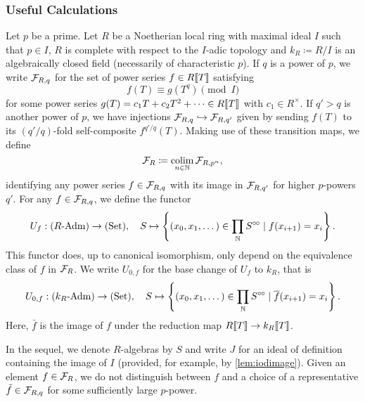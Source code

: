 \documentclass[../main.tex]{subfiles}
\begin{document}
\subsubsection{Useful Calculations} %
\label{ssub:Useful Calculations}
Let $p$ be a prime. Let $R$ be a Noetherian local ring with maximal ideal $I$
such that $p \in I$, $R$ is complete with respect to the $I$-adic topology and
$k_R \coloneqq R/I$ is an algebraically closed field (necessarily of
characteristic $p$). If $q$ is a power of $p$, we write $\mathcal{F}_{R,q}$ for the set
of power series $f \in R\llbracket T \rrbracket$ satisfying 
\begin{equation} \label{eq:condonpowerseries}
  f(T) \equiv g(T^q) \pmod I
\end{equation}
for some power series $g(T) = c_1 T + c_2 T^2 + \dots \in R\llbracket T \rrbracket$ with 
$c_1 \in R^\times$. 
If $q'>q$ is another power of $p$, we have injections $\mathcal{F}_{R,q} \hookrightarrow \mathcal{F}_{R,q'}$
given by sending $f(T)$ to its $(q'/q)$-fold self-composite $f^{q'/q}(T)$. 
Making use of these transition maps, we define
\begin{equation*}
  \mathcal{F}_R \coloneqq \operatorname*{colim}_{n \in \mathbb{N}} \mathcal{F}_{R, p^n},
\end{equation*}
identifying any power series $f \in \mathcal{F}_{R,q}$ with its image in $\mathcal{F}_{R,q'}$ for 
higher $p$-powers $q'$. 
For any $f \in \mathcal{F}_{R,q}$, we define the functor
\begin{equation*}
  U_f: {({R}\text-\allowbreak\mathrm{Adm})} \to {(\mathrm{Set})}, \quad S \mapsto \left\{(x_0,x_1, \dots) \in \prod_{\mathbb{N}} S^{\circ \hspace{-0.5pt} \circ} 
                                          \mid f(x_{i+1}) = x_i\right\}.
\end{equation*}
This functor does, up to canonical isomorphism, only depend on the equivalence
class of $f$ in $\mathcal{F}_{R}$. 
We write $U_{0,f}$ for the base change of $U_f$ to $k_R$, that is
\begin{equation*}
  U_{0,f}: {({k_R}\text-\allowbreak\mathrm{Adm})} \to {(\mathrm{Set})}, \quad S \mapsto \left\{(x_0,x_1, \dots) \in
                              \prod_{\mathbb{N}} S^{\circ \hspace{-0.5pt} \circ} \mid \overline f(x_{i+1}) = x_i\right\}.
\end{equation*}
Here, $\bar f$ is the image of $f$ under the reduction map $R\llbracket T \rrbracket \to
k_R\llbracket T \rrbracket$. 

In the sequel, we denote $R$-algebras by $S$ and write $J$ for an ideal
of definition containing the image of $I$ (provided, for example, by \ref{lem:iodimage}).
Given an element $f\in \mathcal{F}_R$, we do not distinguish between $f$ and a choice of a 
representative $\tilde f \in \mathcal{F}_{R,q}$ for some sufficiently large $p$-power.
\end{document}
